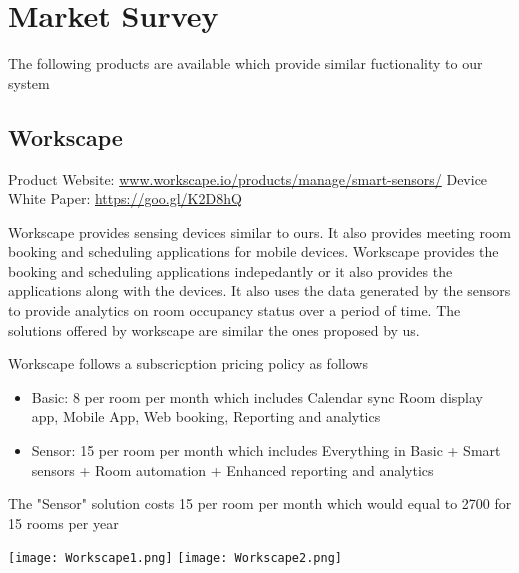\chapter{Market Survey}
The following products are available which provide similar fuctionality to our system

\section{Workscape}

Product Website: 
\url{www.workscape.io/products/manage/smart-sensors/}
\newline
Device White Paper: 
\url{https://goo.gl/K2D8hQ}

\vspace{10pt}

Workscape\cite{workscape} provides sensing devices similar to ours. It also provides meeting room booking and scheduling applications for mobile devices.
Workscape provides the booking and scheduling applications indepedantly or it also provides the applications along with the devices.
It also uses the data generated by the sensors to provide analytics on room occupancy status over a period of time.
The solutions offered by workscape are similar the ones proposed by us.

Workscape follows a subscricption pricing policy as follows
\begin{itemize}
\item Basic: 8\textdollar \hspace{1pt} per room per month which includes Calendar sync Room display app, Mobile App, Web booking, Reporting and analytics
\item Sensor: 15\textdollar \hspace{1pt} per room per month which includes Everything in Basic + Smart sensors + Room automation + Enhanced reporting and analytics
\end{itemize}

The "Sensor" solution costs 15\textdollar  \hspace{1pt} per room per month which would equal to 2700\textdollar \hspace{1pt} for 15 rooms per year

\vspace{10pt}

\begin{center}
	\texttt{[image: Workscape1.png]}
	\hspace{40pt}
	\texttt{[image: Workscape2.png]}
\end{center}

